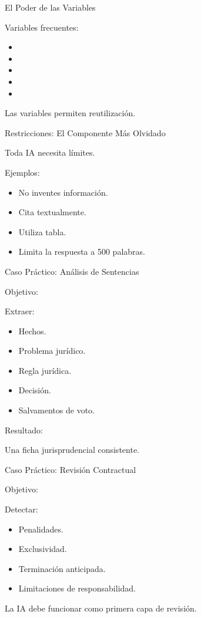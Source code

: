 \documentclass[aspectratio=169]{beamer}
\begin{document}
\begin{frame}{El Poder de las Variables}


Variables frecuentes:

\begin{itemize}
  \item [TIPO DE CONTRATO]
  \item [JURISDICCIÓN]
  \item [TIPO DE PROCESO]
  \item [ROL DEL CLIENTE]
  \item [DOCUMENTO]
\end{itemize}
Las variables permiten reutilización.

\end{frame}

\begin{frame}{Restricciones: El Componente Más Olvidado}


Toda IA necesita límites.

Ejemplos:

\begin{itemize}
  \item No inventes información.
  \item Cita textualmente.
  \item Utiliza tabla.
  \item Limita la respuesta a 500 palabras.
\end{itemize}
\end{frame}

\begin{frame}{Caso Práctico: Análisis de Sentencias}


Objetivo:

Extraer:

\begin{itemize}
  \item Hechos.
  \item Problema jurídico.
  \item Regla jurídica.
  \item Decisión.
  \item Salvamentos de voto.
\end{itemize}
Resultado:

Una ficha jurisprudencial consistente.

\end{frame}

\begin{frame}{Caso Práctico: Revisión Contractual}


Objetivo:

Detectar:

\begin{itemize}
  \item Penalidades.
  \item Exclusividad.
  \item Terminación anticipada.
  \item Limitaciones de responsabilidad.
\end{itemize}
La IA debe funcionar como primera capa de revisión.

\end{frame}
\end{document}
